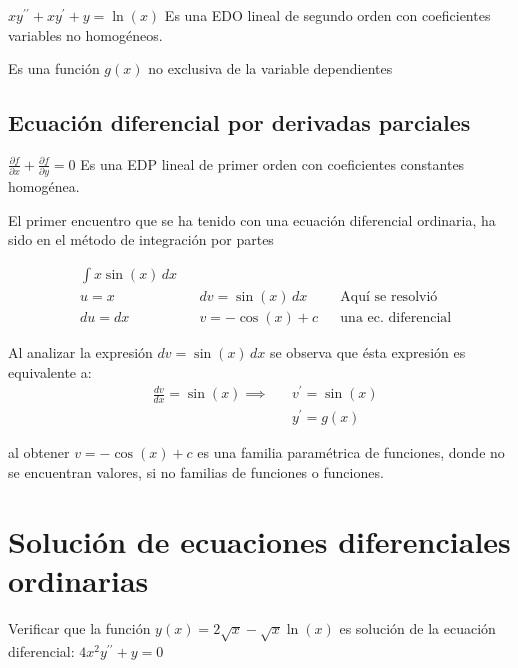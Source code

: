\begin{example}
    $xy^{\prime\prime}+xy^{\prime}+y=\ln{(x)}$
    Es una EDO lineal de segundo orden con coeficientes variables no homogéneos.
\end{example}

\begin{definition}[No homogeneidad]
    Es una función $g(x)$ no exclusiva de la variable dependientes
\end{definition}

\subsection{Ecuación diferencial por derivadas parciales}

\begin{example}
    $\frac{\partial f}{\partial x}+\frac{\partial f}{\partial y}=0$
    Es una EDP lineal de primer orden con coeficientes constantes homogénea.
\end{example}

El primer encuentro que se ha tenido con una ecuación diferencial ordinaria, ha sido en el método de integración por partes

\begin{example}
    \begin{align*}
        &\int x\sin{(x)}\, dx&&&&\\ 
        &u=x&&dv=\sin{(x)}\, dx&&\text{Aquí se resolvió}\\
        &du=dx&&v=-\cos{(x)}+c&&\text{una ec. diferencial}
    \end{align*}
\end{example}
Al analizar la expresión $dv=\sin{(x)}\,dx$ se observa que ésta expresión es equivalente a: 
\begin{align*}
    &\frac{dv}{dx}=\sin{(x)}\implies &&v^{\prime}=\sin{(x)}\\
    &                                &&y^{\prime}=g(x)
\end{align*}

al obtener $v=-\cos{(x)}+c$ es una familia paramétrica de funciones, donde no se encuentran valores, si no familias de funciones o funciones.

\section{Solución de ecuaciones diferenciales ordinarias}

\begin{example}
Verificar que la función $y(x)=2\sqrt{x}-\sqrt{x}\ln{(x)}$ es solución de la ecuación diferencial: $4x^2y^{\prime\prime}+y=0$
\end{example}

